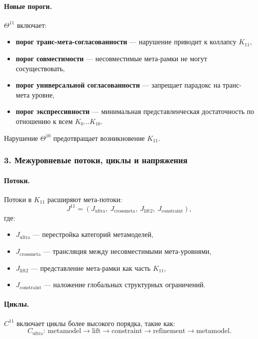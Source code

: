 \paragraph{Новые пороги.}
$\Theta^{11}$ включает:
\begin{itemize}
  \item \textbf{порог транс-мета-согласованности} — нарушение приводит к
        коллапсу $K_{11}$,
  \item \textbf{порог совместимости} — несовместимые мета-рамки не могут
        сосуществовать,
  \item \textbf{порог универсальной согласованности} — запрещает парадокс на
        транс-мета уровне,
  \item \textbf{порог экспрессивности} — минимальная представленческая
        достаточность по отношению к всем $K_0\dots K_{10}$.
\end{itemize}

Нарушение $\Theta^{10}$ предотвращает возникновение $K_{11}$.

\subsubsection{3. Межуровневые потоки, циклы и напряжения}

\paragraph{Потоки.}
Потоки в $K_{11}$ расширяют мета-потоки:
\[
J^{11} = (J_{\mathrm{ultra}},\ J_{\mathrm{crossmeta}},\
         J_{\mathrm{lift2}},\ J_{\mathrm{constraint}}),
\]
где:
\begin{itemize}
  \item $J_{\mathrm{ultra}}$ — перестройка категорий метамоделей,
  \item $J_{\mathrm{crossmeta}}$ — трансляция между несовместимыми мета-уровнями,
  \item $J_{\mathrm{lift2}}$ — представление мета-рамки как часть $K_{11}$,
  \item $J_{\mathrm{constraint}}$ — наложение глобальных структурных ограничений.
\end{itemize}

\paragraph{Циклы.}
$C^{11}$ включает циклы более высокого порядка, такие как:
\[
C_{\mathrm{ultra}}:\
\text{metamodel} \rightarrow \text{lift} \rightarrow \text{constraint}
\rightarrow \text{refinement} \rightarrow \text{metamodel}.
\]

